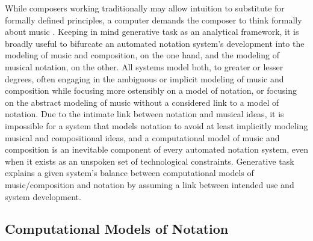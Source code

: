 \documentclass{article}
\begin{document}
While composers working traditionally may allow intuition to substitute for
formally defined principles, a computer demands the composer to think formally
about music \cite{Xenakis:1992rq}. Keeping in mind generative task as an
analytical framework, it is broadly useful to bifurcate an automated notation
system's development into the modeling of music and composition, on the one
hand, and the modeling of musical notation, on the other. All systems model
both, to greater or lesser degrees, often engaging in the ambiguous or implicit
modeling of music and composition while focusing more ostensibly on a model of
notation, or focusing on the abstract modeling of music without a considered
link to a model of notation. Due to the intimate link between notation and
musical ideas, it is impossible for a system that models notation to avoid at
least implicitly modeling musical and compositional ideas, and a computational
model of music and composition is an inevitable component of every automated
notation system, even when it exists as an unspoken set of technological
constraints. Generative task explains a given system's balance between
computational models of music/composition and notation by assuming a link
between intended use and system development.

\subsection{Computational Models of Notation}
\end{document}
